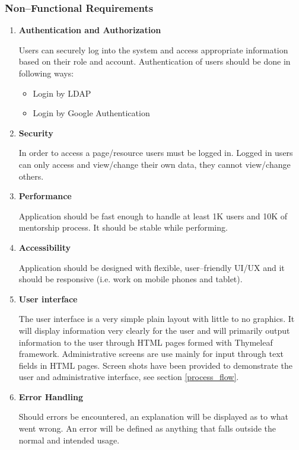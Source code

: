 \documentclass[10pt]{article}
\begin{document}
\subsubsection{Non--Functional Requirements} \label{nonfunctional_requirements}
\begin{enumerate}

\item \textbf{Authentication and Authorization}

Users can securely log into the system and access appropriate information based on their
role and account. Authentication of users should be done in following ways:
\begin{itemize}
    \item Login by LDAP
    \item Login by Google Authentication
\end{itemize}


\item \textbf{Security}

In order to access a page/resource users must be logged in. Logged in users can only access
and view/change their own data, they cannot view/change others.


\item \textbf{Performance}

Application should be fast enough to handle at least 1K users and 10K of mentorship process.
It should be stable while performing.


\item \textbf{Accessibility}

Application should be designed with flexible, user--friendly UI/UX and it should be
responsive (i.e. work on mobile phones and tablet).


\item \textbf{User interface}

The user interface is a very simple plain layout with little to no graphics. It will display
information very clearly for the user and will primarily output information to the user
through HTML pages formed with Thymeleaf framework. Administrative screens are use mainly
for input through text fields in HTML pages. Screen shots have been provided to demonstrate
the user and administrative interface, see section \ref{process_flow}.


\item \textbf{Error Handling}

Should errors be encountered, an explanation will be displayed as to what went wrong.
An error will be defined as anything that falls outside the normal and intended usage.



\end{enumerate}
\end{document}
